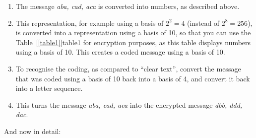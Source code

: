 \documentclass[a4paper,11pt,oneside,openright,titlepage]{scrbook}
\begin{document}
\begin{enumerate}
    \item The message \emph{aba, cad, aca} is converted into numbers,
        as described above.

    \item This representation, for example using a basis of $2^2=4$
        (instead of $2^8=256$), is converted into a representation
        using a basis of 10, so that you can use the
        Table~[\ref{table1}]{table1} for encryption purposes,
        as this table displays numbers using a basis of 10. This
        creates a coded message using a basis of 10.

    \item To recognise the coding, as compared to ``clear text'',
        convert the message that was coded using a basis of 10 back
        into a basis of 4, and convert it back into a letter sequence.

    \item This turns the message \emph{aba, cad, aca} into the
        encrypted message \emph{dbb, ddd, dac}.
\end{enumerate}

\clearpage
And now in detail:
\end{document}
